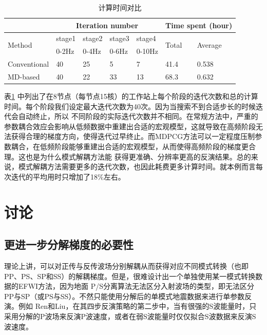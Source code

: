 \begin{table}[!htb]
    \caption{计算时间对比}
    \label{table:TotalComputime}
	\centering 
    \begin{tabular}{p{1.8cm}p{1.0cm}p{1.0cm}p{1.0cm}p{1.2cm}p{1.0cm}p{1.0cm}}
    \hline
    \quad&\multicolumn{4}{c}{Iteration number}&\multicolumn{2}{c}{Time spent (hour)} \\
    \hline
    \multirow{2}{*}{Method} & stage1 &stage2 &stage3 &stage4 &\multirow{2}{*}{Total}
    &\multirow{2}{*}{Average} \\
    & 0-2Hz &0-4Hz&0-6Hz&0-10Hz\\
    \hline
    Conventional&  40   &25&5& 7  &41.4&0.538\\
    MD-based &   40  & 22 &33 &13&68.3&0.632\\
    \hline
    \end{tabular}
\end{table}

表\ref{table:TotalComputime}
中列出了在8节点（每节点15核）的工作站上每个阶段的迭代次数和总的计算时间。每个阶段我们设定最大迭代次数为40次。因为当搜索不到合适步长的时候迭代会自动终止，所以
不同阶段的实际迭代次数并不相同。在常规方法中，严重的参数耦合效应会影响从低频数据中重建出合适的宏观模型，这就导致在高频阶段无法获得合理的梯度方向，使得迭代过早终止。而MDPCG方法可以一定程度压制参数耦合，在低频阶段能够重建出合适的宏观模型，从而使得高频阶段的梯度更合理。这也是为什么模式解耦方法能
获得更准确、分辨率更高的反演结果。总的来说，模式解耦方法需要更多的迭代次数，也因此耗费更多计算时间。就本例而言每次迭代的平均用时只增加了18\%左右。
\section{讨论}
\subsection{更进一步分解梯度的必要性}
理论上讲，可以对正传与反传波场分别解耦从而获得对应不同模式转换（也即PP、PS、SP和SS）的解耦梯度。但是，很难设计出一个单独使用某一模式转换数据的EFWI方法，因为地面
P/S分离算法无法区分入射波场的类型，即无法区分PP与SP（或PS与SS）。不然只能使用分解后的单模式地震数据来进行单参数反演。例如
Ren和Liu\cite{ren.liu:2016}，在其四步反演策略的第二步中，当有很强的S波能量时，只采用分解的P波场来反演P波速度，或者在弱S波能量时仅仅拟合S波数据来反演S波速度。


